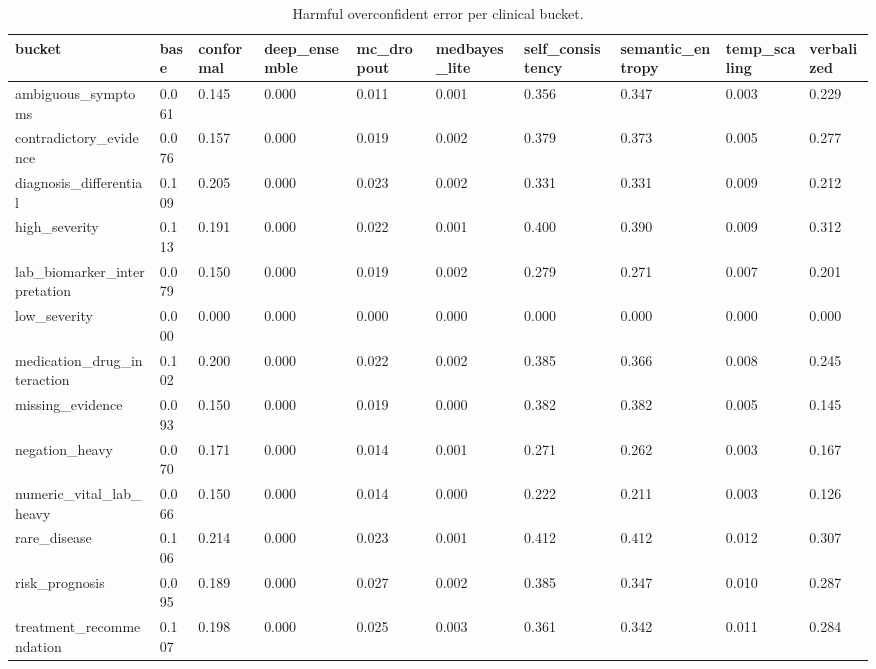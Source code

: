 \begin{table}[htbp]
\centering
\caption{Harmful overconfident error per clinical bucket.}
\label{tab:bucket_harmful}
\begin{tabular}{llllllllll}
\toprule
bucket & base & conformal & deep\_ensemble & mc\_dropout & medbayes\_lite & self\_consistency & semantic\_entropy & temp\_scaling & verbalized \\
\midrule
ambiguous\_symptoms & 0.061 & 0.145 & 0.000 & 0.011 & 0.001 & 0.356 & 0.347 & 0.003 & 0.229 \\
contradictory\_evidence & 0.076 & 0.157 & 0.000 & 0.019 & 0.002 & 0.379 & 0.373 & 0.005 & 0.277 \\
diagnosis\_differential & 0.109 & 0.205 & 0.000 & 0.023 & 0.002 & 0.331 & 0.331 & 0.009 & 0.212 \\
high\_severity & 0.113 & 0.191 & 0.000 & 0.022 & 0.001 & 0.400 & 0.390 & 0.009 & 0.312 \\
lab\_biomarker\_interpretation & 0.079 & 0.150 & 0.000 & 0.019 & 0.002 & 0.279 & 0.271 & 0.007 & 0.201 \\
low\_severity & 0.000 & 0.000 & 0.000 & 0.000 & 0.000 & 0.000 & 0.000 & 0.000 & 0.000 \\
medication\_drug\_interaction & 0.102 & 0.200 & 0.000 & 0.022 & 0.002 & 0.385 & 0.366 & 0.008 & 0.245 \\
missing\_evidence & 0.093 & 0.150 & 0.000 & 0.019 & 0.000 & 0.382 & 0.382 & 0.005 & 0.145 \\
negation\_heavy & 0.070 & 0.171 & 0.000 & 0.014 & 0.001 & 0.271 & 0.262 & 0.003 & 0.167 \\
numeric\_vital\_lab\_heavy & 0.066 & 0.150 & 0.000 & 0.014 & 0.000 & 0.222 & 0.211 & 0.003 & 0.126 \\
rare\_disease & 0.106 & 0.214 & 0.000 & 0.023 & 0.001 & 0.412 & 0.412 & 0.012 & 0.307 \\
risk\_prognosis & 0.095 & 0.189 & 0.000 & 0.027 & 0.002 & 0.385 & 0.347 & 0.010 & 0.287 \\
treatment\_recommendation & 0.107 & 0.198 & 0.000 & 0.025 & 0.003 & 0.361 & 0.342 & 0.011 & 0.284 \\
\bottomrule
\end{tabular}
\end{table}

